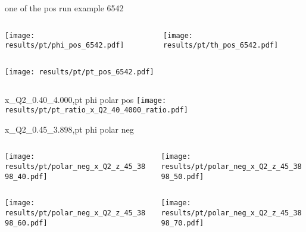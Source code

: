 \begin{frame}{one of the pos run example 6542}
\begin{columns}
\begin{column}[T]{0.5\textwidth}
\texttt{[image: results/pt/phi\_pos\_6542.pdf]}
\end{column}
\begin{column}[T]{0.5\textwidth}
\texttt{[image: results/pt/th\_pos\_6542.pdf]}
\end{column}
\end{columns}
\begin{columns}
\begin{column}[T]{0.5\textwidth}
\texttt{[image: results/pt/pt\_pos\_6542.pdf]}
\end{column}
\begin{column}[T]{0.5\textwidth}
\end{column}
\end{columns}
\end{frame}
\begin{frame}{x\_Q2\_0.40\_4.000,pt phi polar pos}
\texttt{[image: results/pt/pt\_ratio\_x\_Q2\_40\_4000\_ratio.pdf]}
\end{frame}
\begin{frame}{x\_Q2\_0.45\_3.898,pt phi polar neg}
\begin{columns}
\begin{column}[T]{0.5\textwidth}
\texttt{[image: results/pt/polar\_neg\_x\_Q2\_z\_45\_3898\_40.pdf]}
\end{column}
\begin{column}[T]{0.5\textwidth}
\texttt{[image: results/pt/polar\_neg\_x\_Q2\_z\_45\_3898\_50.pdf]}
\end{column}
\end{columns}
\begin{columns}
\begin{column}[T]{0.5\textwidth}
\texttt{[image: results/pt/polar\_neg\_x\_Q2\_z\_45\_3898\_60.pdf]}
\end{column}
\begin{column}[T]{0.5\textwidth}
\texttt{[image: results/pt/polar\_neg\_x\_Q2\_z\_45\_3898\_70.pdf]}
\end{column}
\end{columns}
\end{frame}
